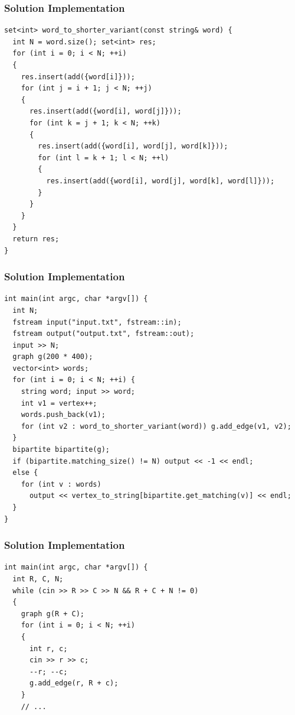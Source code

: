 \documentclass{beamer}
\newcommand{\uvalink}[2]{UVa Online Judge (http://uva.onlinejudge.org)
  problem number \href{#2}{\textcolor{blue}{#1}.}}
\newcounter{exo}
\newcommand{\exo}{
  \addtocounter{exo}{1}
  Exercice \arabic{exo}
}
\begin{document}
\begin{frame}[containsverbatim]
\frametitle{Solution Implementation}
\scriptsize

\begin{lstlisting}
set<int> word_to_shorter_variant(const string& word) {
  int N = word.size(); set<int> res;
  for (int i = 0; i < N; ++i)
  {
    res.insert(add({word[i]}));
    for (int j = i + 1; j < N; ++j)
    {
      res.insert(add({word[i], word[j]}));
      for (int k = j + 1; k < N; ++k)
      {
        res.insert(add({word[i], word[j], word[k]}));
        for (int l = k + 1; l < N; ++l)
        {
          res.insert(add({word[i], word[j], word[k], word[l]}));
        }
      }
    }
  }
  return res;
}
\end{lstlisting}

\end{frame}

\begin{frame}[containsverbatim]
\frametitle{Solution Implementation}
\scriptsize

\begin{lstlisting}
int main(int argc, char *argv[]) {
  int N;
  fstream input("input.txt", fstream::in);
  fstream output("output.txt", fstream::out);
  input >> N;
  graph g(200 * 400);
  vector<int> words;
  for (int i = 0; i < N; ++i) {
    string word; input >> word;
    int v1 = vertex++;
    words.push_back(v1);
    for (int v2 : word_to_shorter_variant(word)) g.add_edge(v1, v2);
  }
  bipartite bipartite(g);
  if (bipartite.matching_size() != N) output << -1 << endl;
  else {
    for (int v : words)
      output << vertex_to_string[bipartite.get_matching(v)] << endl;
  }
}
\end{lstlisting}

\end{frame}

\fi


\ifanswers

\begin{frame}[containsverbatim]
\frametitle{Solution Implementation}
\scriptsize

\begin{lstlisting}
int main(int argc, char *argv[]) {
  int R, C, N;
  while (cin >> R >> C >> N && R + C + N != 0)
  {
    graph g(R + C);
    for (int i = 0; i < N; ++i)
    {
      int r, c;
      cin >> r >> c;
      --r; --c;
      g.add_edge(r, R + c);
    }
    // ...
\end{lstlisting}

\end{frame}
\end{document}
